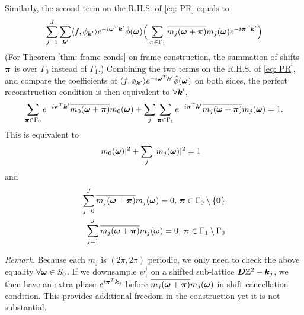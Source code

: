 Similarly, the second term on the R.H.S. of \eqref{eq: PR} equals to 
\begin{align*}
\sum_{j=1}^J\sum_{\boldsymbol{k}'}\langle f,\phi_{\boldsymbol{k}'}\rangle e^{-i\boldsymbol{\omega}^T \boldsymbol{k}'}\hat{\phi}(\boldsymbol{\omega})\Big(\sum_{\boldsymbol{\pi}\in\Gamma_1} \overline{m_j(\boldsymbol{\omega}+\boldsymbol{\pi})}m_j(\boldsymbol{\omega})e^{-i\boldsymbol{\pi}^T\boldsymbol{k}'} \Big)
\end{align*}
(For Theorem \ref{thm: frame-conds} on frame construction, the summation of shifts $\boldsymbol{\pi}$ is over $\Gamma_0$ instead of $\Gamma_1$.) 
Combining the two terms on the R.H.S. of \eqref{eq: PR}, and compare the coefficients of $\langle f,\phi_{\boldsymbol{k}'}\rangle e^{-i\boldsymbol{\omega}^T \boldsymbol{k}'}\hat{\phi}(\boldsymbol{\omega})$ on both sides, the perfect reconstruction condition is then equivalent to $\forall \boldsymbol{k}'$,
\begin{align*}
\sum_{\boldsymbol{\pi}\in\Gamma_0}e^{-i\boldsymbol{\pi}^T\boldsymbol{k}'}\overline{m_0(\boldsymbol{\omega}+\boldsymbol{\pi})}m_0(\boldsymbol{\omega}) + \sum_j\sum_{\boldsymbol{\pi}\in\Gamma_1} e^{-i\boldsymbol{\pi}^T\boldsymbol{k}'}\overline{m_j(\boldsymbol{\omega}+\boldsymbol{\pi})}m_j(\boldsymbol{\omega}) = 1. 
\end{align*} 
This is equivalent to 
\begin{align*}
&|m_0(\boldsymbol{\omega})|^2 + \sum_j|m_j(\boldsymbol{\omega})|^2 = 1
\end{align*}
and
\begin{align*}
\sum_{j=0}^J\overline{m_j(\boldsymbol{\omega}+\boldsymbol{\pi})}m_j(\boldsymbol{\omega}) = 0, 
\,\boldsymbol{\pi}\in \Gamma_0\setminus\{\boldsymbol{0}\}\\
\sum_{j=1}^J\overline{m_j(\boldsymbol{\omega}+\boldsymbol{\pi})}m_j(\boldsymbol{\omega}) = 0,\,\boldsymbol{\pi}\in \Gamma_1\setminus \Gamma_0
\end{align*}

{\it Remark}.
Because each $m_j$ is $(2\pi,2\pi)$ periodic, we only need to check the above equality $\forall \boldsymbol{\omega}\in S_0$.
If we downsample $\psi_1^j$ on a shifted sub-lattice $\boldsymbol{D}\mathbb{Z}^2-\boldsymbol{k}_j$, we then have an extra phase $e^{i\boldsymbol{\pi}^T\boldsymbol{k}_j}$ before $\overline{m_j(\boldsymbol{\omega}+\boldsymbol{\pi})}m_j(\boldsymbol{\omega})$ in shift cancellation condition. This provides additional freedom in the construction yet it is not substantial.

